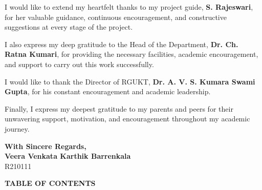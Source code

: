 \documentclass[12pt]{article}
\begin{document}
\vspace{0.3cm}

\noindent
I would like to extend my heartfelt thanks to my project guide, \textbf{S. Rajeswari}, for her valuable guidance, continuous encouragement, and constructive suggestions at every stage of the project.

\vspace{0.3cm}

\noindent
I also express my deep gratitude to the Head of the Department, \textbf{Dr. Ch. Ratna Kumari}, for providing the necessary facilities, academic encouragement, and support to carry out this work successfully.

\vspace{0.3cm}

\noindent
I would like to thank the Director of RGUKT, \textbf{Dr. A. V. S. Kumara Swami Gupta}, for his constant encouragement and academic leadership.

\vspace{0.3cm}

\noindent
Finally, I express my deepest gratitude to my parents and peers for their unwavering support, motivation, and encouragement throughout my academic journey.

\vspace{2cm}

\begin{flushright}
\textbf{With Sincere Regards,}\\
\vspace{0.3cm}
\textbf{Veera Venkata Karthik Barrenkala}\\
R210111
\end{flushright}

\newpage

\begin{center}
\textbf{\Large TABLE OF CONTENTS}
\end{center}

\vspace{0.8cm}

\renewcommand{\arraystretch}{1.45}
\end{document}
